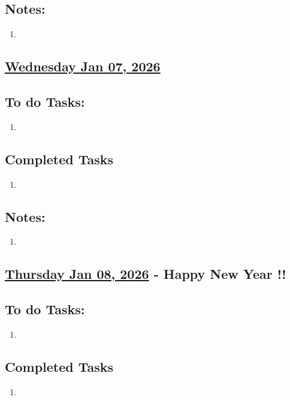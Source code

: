 \subsection*{Notes:}
\begin{enumerate}
    \item 
\end{enumerate}
\subsection*{\underline{Wednesday Jan 07, 2026} }
\subsection*{To do Tasks:}
\begin{enumerate}
    \item 
\end{enumerate}
\subsection*{Completed Tasks}
\begin{enumerate}[\ding{52}]  %
    \item 
\end{enumerate}
\subsection*{Notes:}
\begin{enumerate}
    \item 
\end{enumerate}
\subsection*{\underline{Thursday Jan 08, 2026} -  Happy New Year !!}
\subsection*{To do Tasks:}
\begin{enumerate}
    \item
\end{enumerate}
\subsection*{Completed Tasks}
\begin{enumerate}[\ding{52}]  %
    \item 
\end{enumerate}
